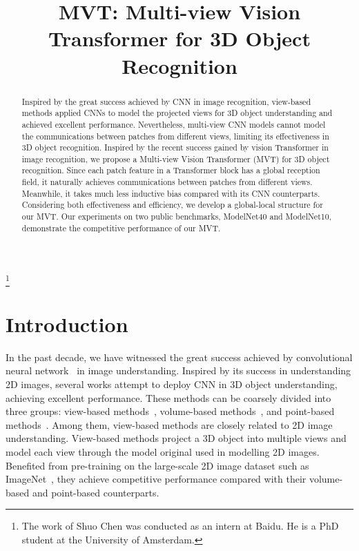 \documentclass{bmvc2k}
\title{MVT: Multi-view Vision Transformer for 3D Object Recognition}
\newcommand\blfootnote[1]{\begingroup
  \renewcommand\thefootnote{}\footnote{#1}\addtocounter{footnote}{-1}\endgroup
}
\begin{document}
\maketitle
\blfootnote{\hspace{-0.55cm} The work of Shuo Chen was conducted as an intern at Baidu. He is a PhD student at the University of Amsterdam.}

\begin{abstract}
Inspired by the great success achieved by CNN in image recognition, view-based methods applied CNNs to model the projected views for 3D object understanding and achieved excellent performance. Nevertheless, multi-view CNN models cannot model the communications between patches from different views, limiting its effectiveness in 3D object recognition. Inspired by the recent success gained by vision Transformer in image recognition, we propose a Multi-view Vision Transformer (MVT) for 3D object recognition. Since each patch feature in a Transformer block has a global reception field, it naturally achieves communications between patches from different views. Meanwhile, it takes much less inductive bias compared with its CNN counterparts. Considering both effectiveness and efficiency, we develop a global-local structure for our MVT. Our experiments on two public benchmarks, ModelNet40 and ModelNet10, demonstrate the competitive performance of our MVT.
\end{abstract}

\section{Introduction}
In the past decade, we have witnessed the great success achieved by convolutional neural network~\cite{krizhevsky2012imagenet,he2016deep} in image understanding. Inspired by its success in understanding 2D images, several works attempt to deploy CNN in 3D object understanding, achieving excellent performance. 
These methods can be coarsely divided into three groups: view-based methods~\cite{su2015multi,wang2017dominant,feng2018gvcnn,kanezaki2018rotationnet,DBLP:journals/tip/HanSLVLZHC19,DBLP:journals/tip/HanLLVLZHC19}, volume-based methods~\cite{wu20153d,maturana2015voxnet,qi2016volumetric,meng2019vv}, and point-based methods~\cite{pointnet,pointnet++,3Dmfv}. Among them, view-based methods are closely related to 2D image understanding. View-based methods project a 3D object into multiple views and model each view through the model original used in modelling 2D images.  Benefited from pre-training on the large-scale 2D image dataset such as ImageNet~\cite{deng2009imagenet}, they achieve competitive performance compared with their volume-based and point-based counterparts.
\end{document}
